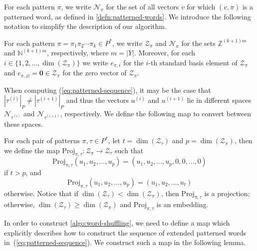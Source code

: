 For each pattern $\pi$, we write $\mathcal{N}_\pi$ for the set of all vectors $v$ for which $(v,\pi)$ is a patterned word, as defined in \cref{defn:patterned-words}.
We introduce the following notation to simplify the description of our algorithm.

\begin{definition}\label{defn:standard-basis-elements}
For each pattern $\pi = \pi_1 \pi_2 \cdots \pi_k \in P^*$, we write $\mathcal{Z}_\pi$ and $\mathcal{N}_\pi$ for the sets $\mathbb{Z}^{(k+1)m}$ and $\mathbb{N}^{(k+1)m}$, respectively, where $m = |Y|$.
Moreover, for each $i \in \{ 1,2,\ldots,\dim(\mathcal{Z}_\pi) \}$ we write $e_{\pi,i}$ for the $i$-th standard basis element of $\mathcal{Z}_\pi$ and $e_{\pi,\varnothing} = \mathbf{0} \in \mathcal{Z}_\pi$ for the zero vector of $\mathcal{Z}_\pi$.
\end{definition}

When computing (\ref{eq:patterned-sequence}), it may be the case that $|\tau^{(i)}|_P \neq |\tau^{(i+1)}|_P$ and thus the vectors $u^{(i)}$ and $u^{(i+1)}$ lie in different spaces $\mathcal{N}_{\tau^{(i)}}$ and $\mathcal{N}_{\tau^{(i+1)}}$, respectively.
We define the following map to convert between these spaces.

\begin{definition}\label{defn:projection}
For each pair of patterns $\pi,\tau \in P^*$, let $t = \dim(\mathcal{Z}_\tau)$ and $p = \dim(\mathcal{Z}_\pi)$, then we define the map $\mathrm{Proj}_{\pi,\tau}\colon \mathcal{Z}_\pi \to \mathcal{Z}_\tau$ such that
\[
	\mathrm{Proj}_{\pi,\tau}(u_1,u_2,\ldots,u_p)
	=
	(u_1,u_2,\ldots,u_p,0,0,\ldots,0)
\]
if $t > p$, and
\[
	\mathrm{Proj}_{\pi,\tau}(u_1,u_2,\ldots,u_p)
	=
	(u_1,u_2,\ldots,u_t)
\]
otherwise.
Notice that if $\dim(\mathcal{Z}_\tau) < \dim(\mathcal{Z}_\pi)$, then $\mathrm{Proj}_{\pi,\tau}$ is a projection; otherwise, $\dim(\mathcal{Z}_\tau) \geqslant \dim(\mathcal{Z}_\pi)$ and $\mathrm{Proj}_{\pi,\tau}$ is an embedding.
\end{definition}

In order to construct \cref{algo:word-shuffling}, we need to define a map which explicitly describes how to construct the sequence of extended patterned words in~(\ref{eq:patterned-sequence}).
We construct such a map in the following lemma.

